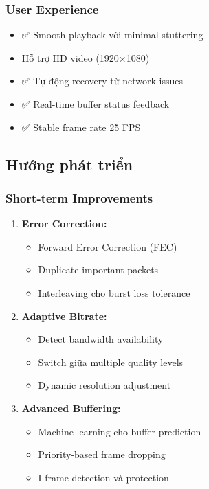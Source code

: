 \subsubsection{User Experience}

\begin{itemize}
    \item ✅ Smooth playback với minimal stuttering
    \item Hỗ trợ HD video (1920$\times$1080)
    \item ✅ Tự động recovery từ network issues
    \item ✅ Real-time buffer status feedback
    \item ✅ Stable frame rate 25 FPS
\end{itemize}

\subsection{Hướng phát triển}

\subsubsection{Short-term Improvements}

\begin{enumerate}
    \item \textbf{Error Correction:}
    \begin{itemize}
        \item Forward Error Correction (FEC)
        \item Duplicate important packets
        \item Interleaving cho burst loss tolerance
    \end{itemize}
    
    \item \textbf{Adaptive Bitrate:}
    \begin{itemize}
        \item Detect bandwidth availability
        \item Switch giữa multiple quality levels
        \item Dynamic resolution adjustment
    \end{itemize}
    
    \item \textbf{Advanced Buffering:}
    \begin{itemize}
        \item Machine learning cho buffer prediction
        \item Priority-based frame dropping
        \item I-frame detection và protection
    \end{itemize}
\end{enumerate}

